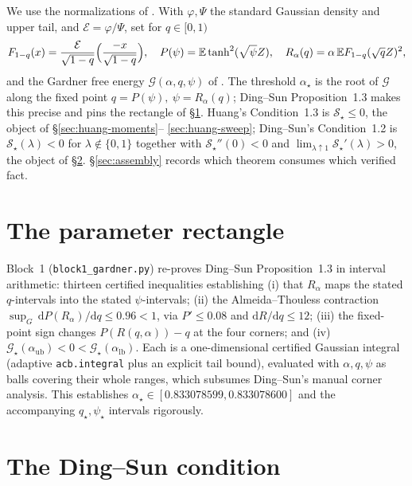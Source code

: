 \documentclass[11pt]{article}
\newcommand{\sG}{\mathscr{G}}
\newcommand{\E}{\mathbb{E}}
\newcommand{\cE}{\mathcal{E}}
\begin{document}
We use the normalizations of \cite{ding2018capacity,huang2024capacity}. With
$\varphi,\Psi$ the standard Gaussian density and upper tail, and
$\cE = \varphi/\Psi$, set for $q\in[0,1)$
\[
  F_{1-q}(x) = \frac{\cE}{\sqrt{1-q}}\Bigl(\frac{-x}{\sqrt{1-q}}\Bigr),
  \quad
  P(\psi) = \E\tanh^2(\sqrt\psi Z),
  \quad
  R_\alpha(q) = \alpha\,\E F_{1-q}(\sqrt q Z)^2,
\]
and the Gardner free energy $\sG(\alpha,q,\psi)$ of
\cite[eq.~(1.4)]{ding2018capacity}. The
threshold $\alpha_\star$ is the root of $\sG$ along the fixed point
$q=P(\psi),\ \psi=R_\alpha(q)$; Ding--Sun Proposition~1.3 makes this precise
and pins the rectangle of \S\ref{sec:gardner}. Huang's Condition~1.3 is
$\mathcal S_\star\le 0$, the object of \S\ref{sec:huang-moments}--%
\ref{sec:huang-sweep}; Ding--Sun's Condition~1.2 is
$\mathscr S_\star(\lambda)<0$ for $\lambda\notin\{0,1\}$ together with
$\mathscr S_\star''(0)<0$ and
$\lim_{\lambda\uparrow1}\mathscr S_\star'(\lambda)>0$, the object of
\S\ref{sec:ds}. \S\ref{sec:assembly} records which theorem consumes which
verified fact.

\section{The parameter rectangle}\label{sec:gardner}

Block~1 (\texttt{block1\_gardner.py}) re-proves Ding--Sun Proposition~1.3 in
interval arithmetic: thirteen certified inequalities establishing (i) that
$R_\alpha$ maps the stated $q$-intervals into the stated $\psi$-intervals;
(ii) the Almeida--Thouless contraction $\sup_{G}\,\mathrm dP(R_\alpha)/\mathrm dq
\le 0.96<1$, via $P'\le 0.08$ and $\mathrm dR/\mathrm dq\le 12$; (iii) the
fixed-point sign changes $P(R(q,\alpha))-q$ at the four corners; and (iv)
$\sG_\star(\alpha_{\mathrm{ub}})<0<\sG_\star(\alpha_{\mathrm{lb}})$. Each is a
one-dimensional certified Gaussian integral (adaptive \texttt{acb.integral}
plus an explicit tail bound), evaluated with $\alpha,q,\psi$ as balls covering
their whole ranges, which subsumes Ding--Sun's manual corner analysis. This
establishes $\alpha_\star\in[0.833078599,0.833078600]$ and the accompanying
$q_\star,\psi_\star$ intervals rigorously.

\section{The Ding--Sun condition}\label{sec:ds}
\end{document}

